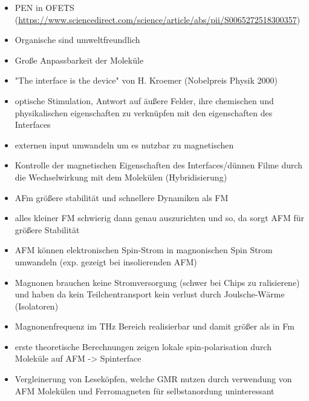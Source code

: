 \begin{itemize}
    \item PEN in OFETS (\url{https://www.sciencedirect.com/science/article/abs/pii/S0065272518300357})
    \item Organische sind umweltfreundlich \cite{scholl_chapter_2018}
    \item Große Anpassbarkeit der Moleküle \cite{scholl_chapter_2018}
    \item "The interface is the device" von H. Kroemer (Nobelpreis Physik 2000)
    \item optische Stimulation, Antwort auf äußere Felder, ihre chemischen und physikalischen eigenschaften zu verknüpfen mit den eigenschaften des Interfaces \cite{IF_16}
    \item externen input umwandeln um es nutzbar zu magnetischen
    \item Kontrolle der magnetischen Eigenschaften des Interfaces/dünnen Filme durch die Wechselwirkung mit dem Molekülen (Hybridisierung) \cite{IF_16}
    \item AFm größere stabilität und schnellere Dynamiken als FM \cite{AFM_1}
    \item alles kleiner FM schwierig dann genau auszurichten und so, da sorgt AFM für größere Stabilität 
    \item AFM können elektronischen Spin-Strom in magnonischen Spin Strom umwandeln (exp. gezeigt bei insolierenden AFM) \cite{AFM_1}
    \item Magnonen brauchen keine Stromversorgung (schwer bei Chips zu ralisierene) und haben da kein Teilchentransport kein verlust durch Joulsche-Wärme (Isolatoren) \cite{AFM_3}
    \item Magnonenfrequenz im THz Bereich realisierbar und damit größer als in Fm \cite{AFM_5}
    \item erste theoretische Berechnungen zeigen lokale spin-polarisation durch Moleküle auf AFM \cite{AFM_2} -> Spinterface
    \item Vergleinerung von Leseköpfen, welche GMR nutzen durch verwendung von AFM Molekülen und Ferromagneten \cite{bagrets_single_2012} für selbstanordung uninteressant
\end{itemize}